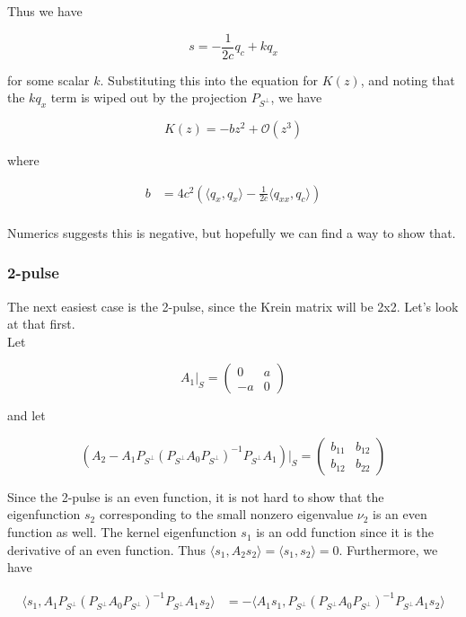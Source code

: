 \documentclass[12pt]{article}
\begin{document}
Thus we have

\[
s = -\frac{1}{2c} q_c + k q_x
\]

for some scalar $k$. Substituting this into the equation for $K(z)$, and noting that the $k q_x$ term is wiped out by the projection $P_{S^\perp}$, we have

\[
K(z) = -b z^2 + \mathcal{O}(z^3)
\]

where

\begin{align*}
b &= 4 c^2 \left( \langle q_x, q_x \rangle - \frac{1}{2c} \langle q_{xx}, q_c \rangle \right)  \\
\end{align*}

Numerics suggests this is negative, but hopefully we can find a way to show that.

\subsubsection{2-pulse}

The next easiest case is the 2-pulse, since the Krein matrix will be 2x2. Let's look at that first. \\

Let 

\[
A_1|_S = \begin{pmatrix} 0 & a \\ -a & 0 \end{pmatrix}
\]

and let

\[
\left( A_2 - A_1 P_{S^\perp} (P_{S^\perp} A_0 P_{S^\perp})^{-1} P_{S^\perp} A_1 \right)|_S = \begin{pmatrix} b_{11} & b_{12} \\ b_{12} & b_{22} \end{pmatrix}
\]

Since the 2-pulse is an even function, it is not hard to show that the eigenfunction $s_2$ corresponding to the small nonzero eigenvalue $\nu_2$ is an even function as well. The kernel eigenfunction $s_1$ is an odd function since it is the derivative of an even function. Thus $\langle s_1, A_2 s_2 \rangle = \langle s_1, s_2 \rangle = 0$. Furthermore, we have

\begin{align*}
\langle s_1, A_1 P_{S^\perp} (P_{S^\perp} A_0 P_{S^\perp})^{-1} P_{S^\perp} A_1 s_2 \rangle 
&= -\langle A_1 s_1, P_{S^\perp} (P_{S^\perp} A_0 P_{S^\perp})^{-1} P_{S^\perp} A_1 s_2 \rangle 
\end{align*}
\end{document}

